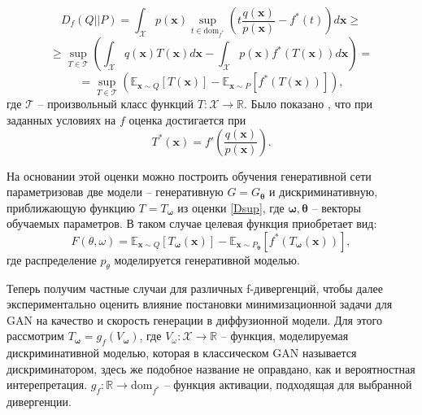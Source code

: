 \documentclass{article}
\begin{document}
\begin{equation}
	D_f(Q||P) = \int_\mathcal{X} p(\mathbf{x})  
	\sup\limits_{t\in \text{dom}_{f^*}} \left( t\frac{q(\mathbf{x})}{p(\mathbf{x})}-f^*(t) \right) d\mathbf{x}
	\geqslant
\end{equation}
\begin{equation}
		\geqslant\sup\limits_{T \in \mathcal{T}}\left(\int _\mathcal{X}q(\mathbf{x})T(\mathbf{x})d\mathbf{x} -  \int _\mathcal{X}p(\mathbf{x})f^*(T(\mathbf{x}))d\mathbf{x} \right) = 
\end{equation}
\begin{equation}
	= \sup\limits_{T \in \mathcal{T}}\left(\mathbb{E}_{\mathbf{x}\sim Q} [T(\mathbf{x})] - \mathbb{E}_{\mathbf{\mathbf{x}}\sim P} [f^*(T(\mathbf{x}))] \right),
		\label{Dsup} 
\end{equation}
где $\mathcal{T}$ -- произвольный класс функций $T:\mathcal{X} \to \mathbb{R}$. Было показано \cite{Nguyen_2010}, что при заданных условиях на $f$ оценка достигается при 
\begin{equation}
	T^*(\mathbf{x}) = f'\left(\frac{q(\mathbf{x})}{p(\mathbf{x})}\right).
\end{equation}

На основании этой оценки можно построить обучения генеративной сети параметризовав две модели -- генеративную $G = G_\mathbf{\theta}$ и дискриминативную, приближающую функцию $T = T_\mathbf{\omega}$ из оценки \ref{Dsup}, где $\mathbf{\omega}, \mathbf{\theta}$ -- векторы обучаемых параметров. В таком случае целевая функция приобретает вид:
\begin{equation}
F(\theta, \omega) = \mathbb{E}_{\mathbf{x}\sim Q} [T_\mathbf{\omega}(\mathbf{x})] - \mathbb{E}_{ \mathbf{\mathbf{x}}\sim P_\mathbf{\theta}}[f^*(T_\mathbf{\omega}(\mathbf{x}))],
\end{equation}
где распределение $p_\theta$ моделируется генеративной моделью.

Теперь получим частные случаи для различных f-дивергенций, чтобы далее экспериментально оценить влияние постановки минимизационной задачи для GAN на качество и скорость генерации в диффузионной модели.
Для этого рассмотрим $T_\mathbf{\omega} = g_f(V_\mathbf{\omega})$, где $V_\omega : \mathcal{X} \to \mathbb{R}$ -- функция, моделируемая дискриминативной моделью, которая в классическом GAN называется дискриминатором, здесь же подобное название не оправдано, как и вероятностная интерепретация. $g_f: \mathbb{R} \to \text{dom}_{f^*}$ -- функция активации, подходящая для выбранной дивергенции.
\end{document}
